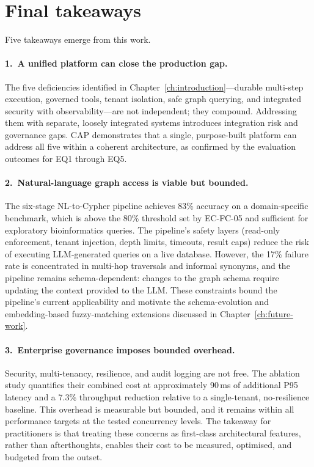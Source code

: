 \documentclass[a4paper]{sapthesis}
\begin{document}
\section{Final takeaways}
\label{sec:takeaways}

Five takeaways emerge from this work.

\paragraph{1.\ A unified platform can close the production gap.}
The five deficiencies identified in Chapter~\ref{ch:introduction}---durable
multi-step execution, governed tools, tenant isolation, safe graph
querying, and integrated security with observability---are not independent;
they compound.  Addressing them with separate, loosely integrated systems
introduces integration risk and governance gaps.  CAP demonstrates that a
single, purpose-built platform can address all five within a coherent
architecture, as confirmed by the evaluation outcomes for EQ1 through EQ5.

\paragraph{2.\ Natural-language graph access is viable but bounded.}
The six-stage NL-to-Cypher pipeline achieves 83\% accuracy on a
domain-specific benchmark, which is above the 80\% threshold set by
EC-FC-05 and sufficient for exploratory bioinformatics queries.
The pipeline's safety layers (read-only enforcement, tenant injection,
depth limits, timeouts, result caps) reduce the risk of executing
LLM-generated queries on a live database.  However, the 17\% failure rate
is concentrated in multi-hop traversals and informal synonyms, and the
pipeline remains schema-dependent: changes to the graph schema require
updating the context provided to the LLM.  These constraints bound the
pipeline's current applicability and motivate the schema-evolution and
embedding-based fuzzy-matching extensions discussed in
Chapter~\ref{ch:future-work}.

\paragraph{3.\ Enterprise governance imposes bounded overhead.}
Security, multi-tenancy, resilience, and audit logging are not free.
The ablation study quantifies their combined cost at approximately 90\,ms
of additional P95 latency and a 7.3\% throughput reduction relative to a
single-tenant, no-resilience baseline.  This overhead is measurable but
bounded, and it remains within all performance targets at the tested
concurrency levels.  The takeaway for practitioners is that treating
these concerns as first-class architectural features, rather than
afterthoughts, enables their cost to be measured, optimised, and budgeted
from the outset.
\end{document}
